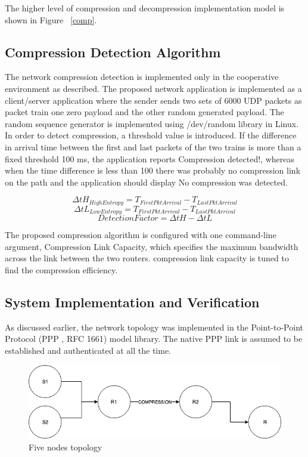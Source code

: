 \documentclass[sigconf]{acmart}
\begin{document}
The higher level of compression and decompression implementation model is shown in Figure ~\ref{comp}.
\subsection{Compression Detection Algorithm}
The network compression detection is implemented only in the cooperative environment as described. The proposed network application is implemented as a client/server application where the sender sends two sets of 6000 UDP packets as packet train one zero payload and the other random generated payload. The random sequence generator is implemented using /dev/random library in Linux. In order to detect compression, a threshold value is introduced. If the difference in arrival time between the first and last packets of the two trains is more than a fixed threshold 100 ms, the application reports Compression detected!, whereas when the time difference is less than 100 there was probably no compression link on the path and the application should display No compression was detected. 

\begin{displaymath}
	\Delta tH_{HighEntropy}  = T_{FirstPktArrival} - T_{LastPktArrival} 
\end{displaymath}
\begin{displaymath}
	\Delta tL_{LowEntropy}  = T_{FirstPktArrival} - T_{LastPktArrival} 
\end{displaymath}
\begin{equation}
 	DetectionFactor = \Delta tH - \Delta tL
\end{equation}
\label{delta}


The proposed compression algorithm is configured with one command-line argument, Compression Link Capacity, which specifies the maximum bandwidth across the link between the two routers. compression link capacity is tuned to find the compression efficiency.

\subsection{System Implementation and Verification}
As discussed earlier, the network topology was implemented in the Point-to-Point Protocol (PPP , RFC 1661) \cite{point1991autonet} model library. The native PPP link is assumed to be established and authenticated at all the time. 
\begin{figure}[h]
  \centering
  \includegraphics[width=\linewidth]{topoImp}
  \caption{Five nodes topology}
  \label{topoImp}
\end{figure}
\end{document}
